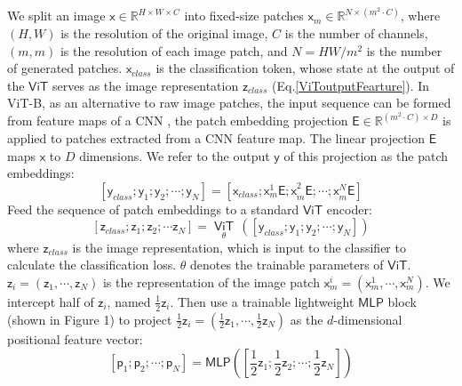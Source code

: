 \documentclass{article}
\begin{document}
We split an image $\mathsf{x}\in {{\mathbb{R}}^{H\times W\times C}}$ into fixed-size patches ${{\mathsf{x}}_{m}}\in {{\mathbb{R}}^{N\times ({{m}^{2}}\cdot C)}}$, where $\left( H,W \right)$ is the resolution of the original image, $C$ is the number of channels, $\left( m,m \right)$ is the resolution of each image patch, and $N=HW/{{m}^{2}}$ is the number of generated patches. ${{\mathsf{x}}_{class}}$ is the classification token, whose state at the output of the $\mathsf{ViT}$ serves as the image representation ${{\mathsf{z}}_{class}}$ (Eq.\ref{ViToutputFearture}). In ViT-B, as an alternative to raw image patches, the input sequence can be formed from feature maps of a CNN \cite{He_2016_CVPR}, the patch embedding projection $\mathsf{E}\in {{\mathbb{R}}^{({{m}^{2}}\cdot C)\times D}}$ is applied to patches extracted from a CNN feature map. The linear projection $\mathsf{E}$ maps $\mathsf{x}$ to $D$ dimensions. We refer to the output $\mathsf{y}$ of this projection as the patch embeddings:
\begin{equation}
\left[ {{\mathsf{y}}_{class}};{{\mathsf{y}}_{1}}\mathsf{;}{{\mathsf{y}}_{2}};\cdots ;{{\mathsf{y}}_{N}} \right]=\left[ {{\mathsf{x}}_{class}};\mathsf{x}_{m}^{1}\mathsf{E;x}_{m}^{2}\mathsf{E;}\cdots \mathsf{;x}_{m}^{N}\mathsf{E} \right]
  \label{beginprojection}
\end{equation}
Feed the sequence of patch embeddings to a standard $\mathsf{ViT}$ encoder: 
\begin{equation}
\left[ {{\mathsf{z}}_{class}};{{\mathsf{z}}_{1}};{{\mathsf{z}}_{2}};\cdots {{\mathsf{z}}_{N}} \right]=\underset{\theta }{\mathop{\mathsf{ViT}}}\,\left( \left[ {{\mathsf{y}}_{class}};{{\mathsf{y}}_{1}}\mathsf{;}{{\mathsf{y}}_{2}};\cdots ;{{\mathsf{y}}_{N}} \right] \right)
  \label{ViToutputFearture}
\end{equation}
where ${{\mathsf{z}}_{class}}$ is the image representation, which is input to the classifier to calculate the classification loss. $\theta $ denotes the trainable parameters of  $\mathsf{ViT}$. ${{\mathsf{z}}_{i}}=\left( {{\mathsf{z}}_{1}},\cdots ,{{\mathsf{z}}_{N}} \right)$ is the representation of the image patch $\mathsf{x}_{m}^{i}=\left( \mathsf{x}_{m}^{1},\cdots ,\mathsf{x}_{m}^{N} \right)$. We intercept half of ${{\mathsf{z}}_{i}}$, named $\frac{1}{2}{{\mathsf{z}}_{i}}$. Then use a trainable lightweight $\mathsf{MLP}$ block (shown in Figure 1) to project $\frac{1}{2}{{\mathsf{z}}_{i}}=\left( \frac{1}{2}{{\mathsf{z}}_{1}},\cdots ,\frac{1}{2}{{\mathsf{z}}_{N}} \right)$ as the $d$-dimensional positional feature vector:
\begin{equation}
\left[ {{\mathsf{p}}_{1}};{{\mathsf{p}}_{2}};\cdots ;{{\mathsf{p}}_{N}} \right]=\mathsf{MLP}\left( \left[ \frac{1}{2}{{\mathsf{z}}_{1}};\frac{1}{2}{{\mathsf{z}}_{2}};\cdots ;\frac{1}{2}{{\mathsf{z}}_{N}} \right] \right)
  \label{PositionOutputFeature}
\end{equation}
\end{document}
